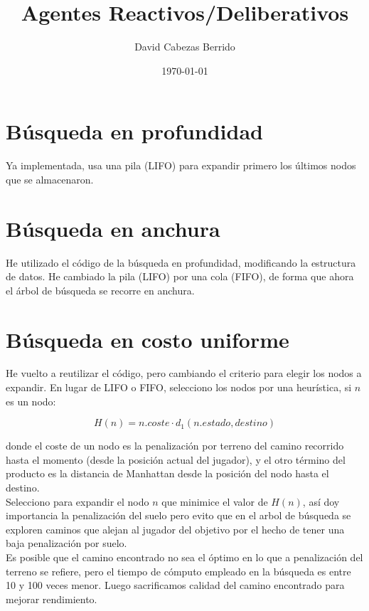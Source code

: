 \documentclass{article}
\begin{document}
\title{Agentes Reactivos/Deliberativos}
\author{David Cabezas Berrido}
\date{\today}
\maketitle

\section{Búsqueda en profundidad}

Ya implementada, usa una pila (LIFO) para expandir primero los últimos
nodos que se almacenaron.

\section{Búsqueda en anchura}

He utilizado el código de la búsqueda en profundidad, modificando la
estructura de datos. He cambiado la pila (LIFO) por una cola (FIFO),
de forma que ahora el árbol de búsqueda se recorre en anchura.

\section{Búsqueda en costo uniforme}

He vuelto a reutilizar el código, pero cambiando el criterio para
elegir los nodos a expandir. En lugar de LIFO o FIFO, selecciono los
nodos por una heurística, si $n$ es un nodo:

\[H(n)=n.coste\cdot d_1(n.estado, destino)\]

donde el coste de un nodo es la penalización por terreno del camino
recorrido hasta el momento (desde la posición actual del jugador), y
el otro término del producto es la distancia de Manhattan desde la
posición del nodo hasta el destino. \\

Selecciono para expandir el nodo $n$ que minimice el valor de $H(n)$,
así doy importancia la penalización del suelo pero evito que
en el arbol de búsqueda se exploren caminos que alejan al jugador del
objetivo por el hecho de tener una baja penalización por suelo. \\

Es posible que el camino encontrado no sea el óptimo en lo que a
penalización del terreno se refiere, pero el tiempo de cómputo
empleado en la búsqueda es entre 10 y 100 veces menor. Luego
sacrificamos calidad del camino encontrado para mejorar rendimiento. \\
\end{document}
